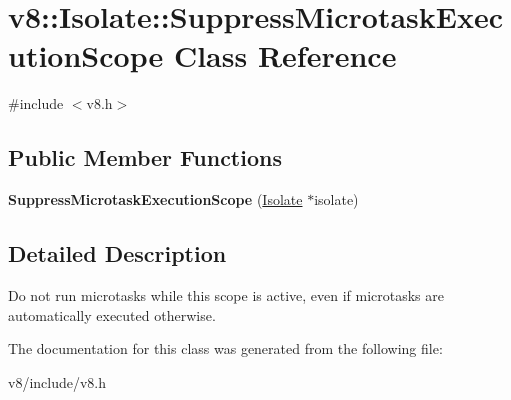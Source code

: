 \hypertarget{classv8_1_1Isolate_1_1SuppressMicrotaskExecutionScope}{}\section{v8\+:\+:Isolate\+:\+:Suppress\+Microtask\+Execution\+Scope Class Reference}
\label{classv8_1_1Isolate_1_1SuppressMicrotaskExecutionScope}


{\ttfamily \#include $<$v8.\+h$>$}

\subsection*{Public Member Functions}
\begin{DoxyCompactItemize}
\item 
{\bfseries Suppress\+Microtask\+Execution\+Scope} (\hyperlink{classv8_1_1Isolate}{Isolate} $\ast$isolate)\hypertarget{classv8_1_1Isolate_1_1SuppressMicrotaskExecutionScope_a846d7dd39f4cfad4dfc4c8c785e4a65e}{}\label{classv8_1_1Isolate_1_1SuppressMicrotaskExecutionScope_a846d7dd39f4cfad4dfc4c8c785e4a65e}

\end{DoxyCompactItemize}


\subsection{Detailed Description}
Do not run microtasks while this scope is active, even if microtasks are automatically executed otherwise. 

The documentation for this class was generated from the following file\+:\begin{DoxyCompactItemize}
\item 
v8/include/v8.\+h\end{DoxyCompactItemize}
